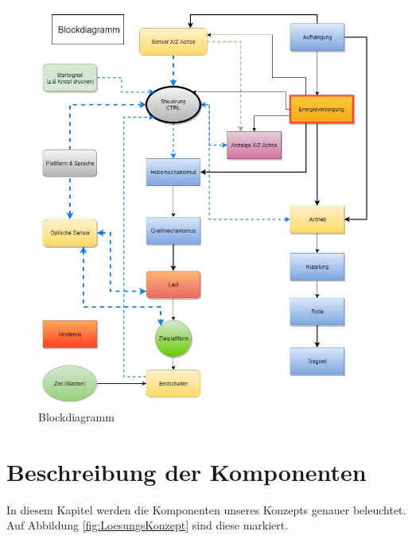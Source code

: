\documentclass[a4paper]{report}
\begin{document}
\begin{figure}[h!]
	\centering
	\includegraphics[keepaspectratio,width=\textwidth]{Blockdiagramm}
	\caption{Blockdiagramm}
	\label{fig:Blockdiagramm}
\end{figure}

\newpage
\section{Beschreibung der Komponenten}
\label{sec:KompBeschrieb}
In diesem Kapitel werden die Komponenten unseres Konzepts genauer beleuchtet. Auf Abbildung \ref{fig:LoesungsKonzept} sind diese markiert.
\end{document}
